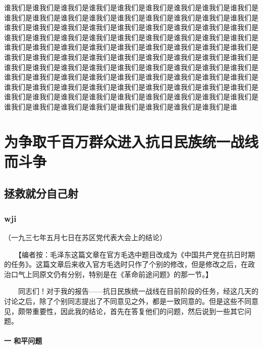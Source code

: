 \documentclass[twocolumn]{cvertbook}
\begin{document}
谁我们是谁我们是谁我们是谁我们是谁我们是谁我们是谁我们是谁我们是谁我们是谁我们是谁我们是谁我们是谁我们是谁我们是谁我们是谁我们是谁我们是谁我们是谁我们是谁我们是谁我们是谁我们是谁我们是谁我们是谁我们是谁我们是谁我们是谁我们是谁我们是谁我们是谁我们是谁我们是谁我们是谁我们是谁我们是谁我们是谁我们是谁我们是谁我们是谁我们是谁我们是谁我们是谁我们是谁我们是谁我们是谁我们是谁我们是谁我们是谁我们是谁我们是谁我们是谁我们是谁我们是谁我们是谁我们是谁我们是谁我们是谁我们是谁我们是谁我们是谁我们是谁我们是谁我们是谁我们是谁我们是谁我们是谁我们是谁我们是谁我们是谁我们是谁我们是谁我们是谁我们是谁我们是谁我们是谁我们是谁我们是谁我们是谁我们是谁我们是谁我们是谁我们是谁我们是谁我们是谁我们是谁我们是谁我们是谁我们是谁我们是谁我们是谁我们是谁我们是谁我们是谁我们是谁我们是谁我们是谁我们是谁我们是谁
\part{为争取千百万群众进入抗日民族统一战线而斗争}
\chapter{拯救就分自己射}
\section{wji}
（一九三七年五月七日在苏区党代表大会上的结论）

　　【编者按：毛泽东这篇文章在官方毛选中题目改成为《中国共产党在抗日时期的任务》。这篇文章后来收入官方毛选时只作了个别的修改，但是修改之后，在政治口气上同原文仍有分别，特别是在《革命前途问题》的那一节。】


　　同志们！对于我的报告——抗日民族统一战线在目前阶段的任务，经这几天的讨论之后，除了个别同志提出了不同意见之外，都是一致同意的。但是这些不同意见，颇带重要性，因此我的结论，首先在答复他们的问题，然后说到一些其它问题。

\subsection{一 和平问题}
\end{document}
